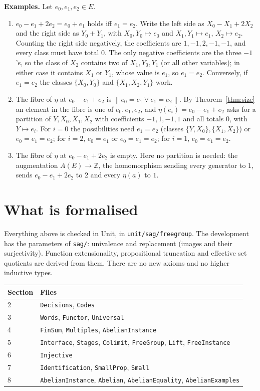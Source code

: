 \documentclass[11pt]{amsart}
\theoremstyle{definition}
\theoremstyle{remark}
\newcommand{\code}[1]{\texttt{#1}}
\newcommand{\mere}[1]{\left\lVert #1\right\rVert}
\newcommand{\Z}{\mathbb{Z}}
\begin{document}
\smallskip\noindent\textbf{Examples.} Let $e_0,e_1,e_2\in E$.
\begin{enumerate}
\item $e_0-e_1+2e_2=e_0+e_1$ holds iff $e_1=e_2$. Write the left side as
$X_0-X_1+2X_2$ and the right side as $Y_0+Y_1$, with $X_0,Y_0\mapsto e_0$
and $X_1,Y_1\mapsto e_1$, $X_2\mapsto e_2$. Counting the right side
negatively, the coefficients are $1,-1,2,-1,-1$, and every class must
have total $0$. The only negative coefficients are the three $-1$'s, so the
class of $X_2$ contains two of $X_1,Y_0,Y_1$ (or all other variables);
in either case it contains $X_1$ or $Y_1$, whose value is $e_1$, so
$e_1=e_2$. Conversely, if $e_1=e_2$ the classes $\{X_0,Y_0\}$ and
$\{X_1,X_2,Y_1\}$ work.
\item The fibre of $\eta$ at $e_0-e_1+e_2$ is $\mere{e_0=e_1\vee e_1=e_2}$.
By Theorem~\ref{thm:size} an element in the fibre is one of
$e_0,e_1,e_2$, and $\eta(e_i)=e_0-e_1+e_2$ asks for a partition of
$Y,X_0,X_1,X_2$ with coefficients $-1,1,-1,1$ and all totals $0$, with
$Y\mapsto e_i$. For $i=0$ the possibilities need $e_1=e_2$ (classes
$\{Y,X_0\},\{X_1,X_2\}$) or $e_0=e_1=e_2$; for $i=2$, $e_0=e_1$ or
$e_0=e_1=e_2$; for $i=1$, $e_0=e_1=e_2$.
\item The fibre of $\eta$ at $e_0-e_1+2e_2$ is empty. Here no partition is
needed: the augmentation $A(E)\to\Z$, the homomorphism sending every
generator to $1$, sends $e_0-e_1+2e_2$ to $2$ and every $\eta(a)$ to $1$.
\end{enumerate}

\section{What is formalised}

Everything above is checked in Unit, in \code{unit/sag/freegroup}. The
development has the parameters of \code{sag/}: univalence and replacement
(images and their surjectivity). Function extensionality, propositional
truncation and effective set quotients are derived from them. There are no
new axioms and no higher inductive types.

\smallskip
\begin{center}
\begin{tabular}{ll}
Section & Files \\ \hline
2 & \code{Decisions}, \code{Codes} \\
3 & \code{Words}, \code{Functor}, \code{Universal} \\
4 & \code{FinSum}, \code{Multiples}, \code{AbelianInstance} \\
5 & \code{Interface}, \code{Stages}, \code{Colimit}, \code{FreeGroup}, \code{Lift}, \code{FreeInstance} \\
6 & \code{Injective} \\
7 & \code{Identification}, \code{SmallProp}, \code{Small} \\
8 & \code{AbelianInstance}, \code{Abelian}, \code{AbelianEquality}, \code{AbelianExamples} \\
\end{tabular}
\end{center}
\smallskip
\end{document}
